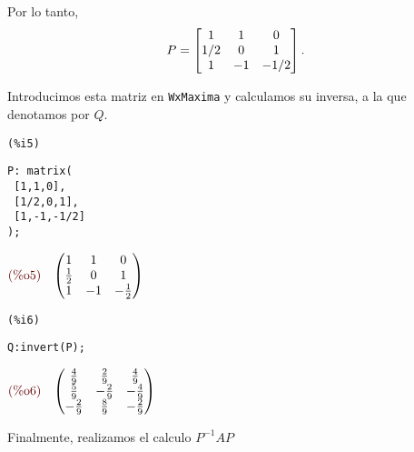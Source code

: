 \begin{solucion}
Por lo tanto,
$$
P=\begin{bmatrix}1&1&0\\ 1/2 & 0 & 1 \\ 1 & -1 &-1/2 \end{bmatrix}.
$$

Introducimos esta matriz en \texttt{WxMaxima} y calculamos su inversa, a la que denotamos por $Q.$


\noindent
\begin{minipage}{8ex}{\color{red}\bf
\begin{verbatim}
(%i5)
\end{verbatim}}
\end{minipage}
\begin{minipage}{\textwidth}{\color{blue}
\begin{verbatim}
P: matrix(
 [1,1,0],
 [1/2,0,1],
 [1,-1,-1/2]
);
\end{verbatim}}
\end{minipage}
\begin{math}\displaystyle
\parbox{8ex}{\color{labelcolor}(\%o5) }
\begin{pmatrix}1 & 1 & 0\cr \frac{1}{2} & 0 & 1\cr 1 & -1 & -\frac{1}{2}\end{pmatrix}
\end{math}


\noindent
\begin{minipage}{8ex}{\color{red}\bf
\begin{verbatim}
(%i6)
\end{verbatim}}
\end{minipage}
\begin{minipage}{\textwidth}{\color{blue}
\begin{verbatim}
Q:invert(P);
\end{verbatim}}
\end{minipage}
\begin{math}\displaystyle
\parbox{8ex}{\color{labelcolor}(\%o6) }
\begin{pmatrix}\frac{4}{9} & \frac{2}{9} & \frac{4}{9}\cr \frac{5}{9} & -\frac{2}{9} & -\frac{4}{9}\cr -\frac{2}{9} &
\frac{8}{9} & -\frac{2}{9}\end{pmatrix}
\end{math}

Finalmente, realizamos el calculo $P^{-1}AP$


\end{solucion}
